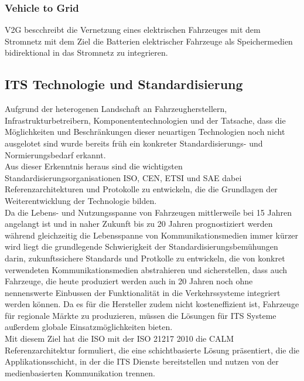     \subsubsection{Vehicle to Grid}
    V2G bescchreibt die Vernetzung eines elektrischen Fahrzeuges mit dem Stromnetz mit dem Ziel die Batterien elektrischer Fahrzeuge als Speichermedien
    bidirektional in das Stromnetz zu integrieren.

    \subsection{ITS Technologie und Standardisierung}

    Aufgrund der heterogenen Landschaft an Fahrzeugherstellern, Infrastrukturbetreibern, Komponententechnologien und der Tatsache, dass die Möglichkeiten
    und Beschränkungen dieser neuartigen Technologien noch nicht ausgelotet sind wurde bereits früh ein konkreter Standardisierungs- und Normierungsbedarf erkannt.\\
    Aus dieser Erkenntnis heraus sind die wichtigsten Standardisierungsorganisationen ISO, CEN, ETSI und SAE dabei Referenzarchitekturen und Protokolle zu entwickeln, die
    die Grundlagen der Weiterentwicklung der Technologie bilden.\\
    Da die Lebens- und Nutzungsspanne von Fahrzeugen mittlerweile bei 15 Jahren angelangt ist und in naher Zukunft bis zu 20 Jahren prognostiziert werden während gleichzeitig die 
    Lebensspanne von Kommunikationsmedien immer kürzer wird liegt die grundlegende Schwierigkeit der Standardisierungsbemühungen darin, zukunftssichere Standards und Protkolle zu entwickeln,
     die von konkret verwendeten Kommunikationsmedien abstrahieren und sicherstellen, dass auch Fahrzeuge, die heute produziert werden auch in 20 Jahren noch ohne nennenswerte Einbussen der Funktionalität in die Verkehrssysteme
    integriert werden können. Da es für die Hersteller zudem nicht kosteneffizient ist, Fahrzeuge für regionale Märkte zu produzieren, müssen die Lösungen für ITS Systeme
    außerdem globale Einsatzmöglichkeiten bieten.\\
    Mit diesem Ziel hat die ISO mit der ISO 21217 2010 die CALM Referenzarchitektur formuliert, die eine schichtbasierte Lösung präsentiert, die die Applikationsschicht, in
    der die ITS Dienste bereitstellen und nutzen von der medienbasierten Kommunikation trennen.\\

